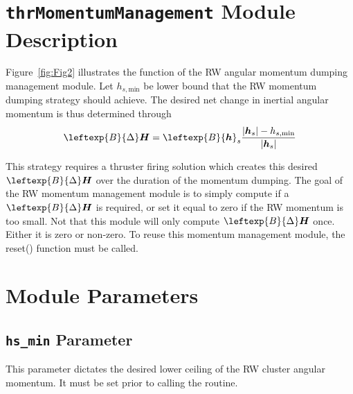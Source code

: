 \documentclass[]{BasiliskReportMemo}
\begin{document}
\section{{\tt thrMomentumManagement}  Module Description}
Figure~\ref{fig:Fig2} illustrates the function of the RW angular momentum dumping management module.  Let $h_{s,\text{min}}$ be lower bound that the RW momentum dumping strategy should achieve.  The desired net change in inertial angular momentum is thus determined through
\begin{equation}
	\leftexp{B}{\Delta}\bm H = \leftexp{B}{\bm h}_{s} \frac{
		|\bm h_{s}| - h_{s,\text{min}}
	}{|\bm h_{s}|} 
\end{equation}

This strategy requires a thruster firing solution which creates this desired $\leftexp{B}{\Delta}\bm H$ over the duration of the momentum dumping.  The goal of the RW momentum management module is to simply compute if a $\leftexp{B}{\Delta}\bm H$ is required, or set it equal to zero if the RW momentum is too small.  Not that this module will only compute $\leftexp{B}{\Delta}\bm H$ once.  Either it is zero or non-zero.  To reuse this momentum management module, the reset() function must be called.




\section{Module Parameters}
\subsection{{\tt hs\_min} Parameter}
This parameter dictates the desired lower ceiling of the RW cluster angular momentum.  It must be set prior to calling the routine.  
\end{document}
